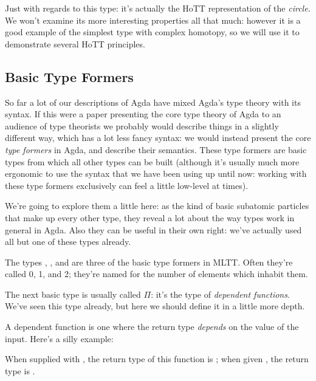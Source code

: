 Just with regards to this  type: it's actually the
HoTT representation of the \emph{circle}.
We won't examine its more interesting properties all that much: however it is a
good example of the simplest type with complex homotopy, so we will use it to
demonstrate several HoTT principles.
\subsection{Basic Type Formers}
So far a lot of our descriptions of Agda have mixed Agda's type theory with its
syntax.
If this were a paper presenting the core type theory of Agda to an audience of
type theorists we probably would describe things in a slightly different way,
which has a lot less fancy syntax: we would instead present the core \emph{type
  formers} in Agda, and describe their semantics.
These type formers are basic types from which all other types can be built
(although it's usually much more ergonomic to use the syntax that we have been
using up until now: working with these type formers exclusively can feel a
little low-level at times).

We're going to explore them a little here: as the kind of basic subatomic
particles that make up every other type, they reveal a lot about the way types
work in general in Agda.
Also they can be useful in their own right: we've actually used all but one of
these types already.

The types \agdabot, \agdatop, and  are three of the basic
type formers in MLTT.
Often they're called 0, 1, and 2; they're named for the number of elements which
inhabit them.

The next basic type is usually called \(\Pi\): it's the type of \emph{dependent
  functions}.
We've seen this type already, but here we should define it in a little more
depth.
\begin{definition}
  A dependent function is one where the return type \emph{depends} on the value
  of the input.
  Here's a silly example:
  \begin{agdalisting*}
  \end{agdalisting*}
  When supplied with , the return type of this
  function is \Nat; when given , the
  return type is .
\end{definition}

